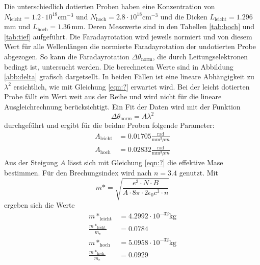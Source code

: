 Die unterschiedlich dotierten Proben haben eine Konzentration von $N_{\text{leicht}}=1.2\cdot10^{18}\text{cm}^{-3}$ und $N_{\text{hoch}}=2.8\cdot10^{18}\text{cm}^{-3}$ und die Dicken $L_{\text{leicht}}=1.296\,$mm und $L_{\text{hoch}}=1.36\,$mm.
Deren Messwerte sind in den Tabellen \ref{tab:hoch} und \ref{tab:tief} aufgeführt.
Die Faradayrotation wird jeweils normiert und von diesem Wert für alle Wellenlängen die normierte Faradayrotation der undotierten Probe abgezogen.
So kann die Faradayrotation $\Delta\theta_\text{norm}$, die durch Leitungselektronen bedingt ist, untersucht werden. 
Die berechneten Werte sind in Abbildung \ref{abb:delta} grafisch dargetsellt.
In beiden Fällen ist eine lineare Abhängigkeit zu $\lambda^2$ ersichtlich, wie mit Gleichung \ref{eqn:?} erwartet wird.
Bei der leicht dotierten Probe fällt ein Wert weit aus der Reihe und wird nicht für die lineare Ausgleichrechnung berücksichtigt.
Ein Fit der Daten wird mit der Funktion
\begin{equation}
  \Delta\theta_{\text{norm}} = A\lambda^2
\end{equation}
durchgeführt und ergibt für die beidne Proben folgende Parameter:
\begin{align*}
  A_{\text{leicht}} &= 0.01705 \frac{\text{rad}}{\text{mm}^3\mu m} \\
  A_{\text{hoch}} &= 0.02832 \frac{\text{rad}}{\text{mm}^3\mu m}
\end{align*}
Aus der Steigung $A$ lässt sich mit Gleichung \ref{eqn:?} die effektive Mase bestimmen.
Für den Brechungsindex wird nach \cite{nGaAs} $n=3.4$ genutzt.
Mit
\begin{equation}
  m*=\sqrt{\frac{e^3\cdot N \cdot B}{A\cdot 8\pi \cdot 2\epsilon_0 c^3 \cdot n }}
\end{equation}
ergeben sich die Werte
\begin{align*}
  m*_{\text{leicht}} &= 4.2992\cdot 10^{-32}\text{kg} \\
  \frac{m*_{\text{leicht}}}{m_e} &= 0.0784 \\
  m*_{\text{hoch}} &= 5.0958\cdot 10^{-32}\text{kg} \\
  \frac{m*_{\text{hoch}}}{m_e} &= 0.0929\\
\end{align*}

